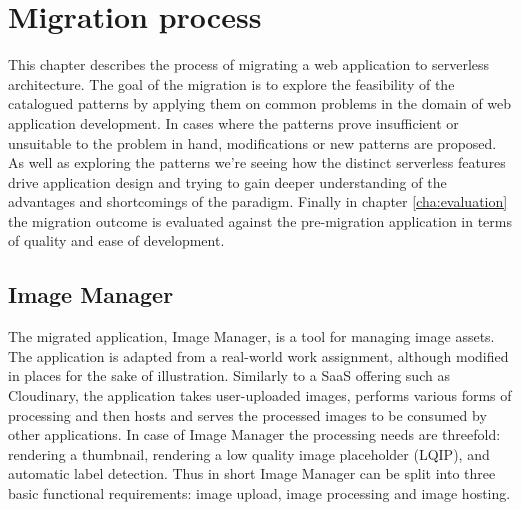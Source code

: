 \chapter{Migration process}

This chapter describes the process of migrating a web application to serverless architecture. The goal of the migration is to explore the feasibility of the catalogued patterns by applying them on common problems in the domain of web application development. In cases where the patterns prove insufficient or unsuitable to the problem in hand, modifications or new patterns are proposed. As well as exploring the patterns we're seeing how the distinct serverless features drive application design and trying to gain deeper understanding of the advantages and shortcomings of the paradigm. Finally in chapter \ref{cha:evaluation} the migration outcome is evaluated against the pre-migration application in terms of quality and ease of development.

\section{Image Manager}

The migrated application, Image Manager, is a tool for managing image assets. The application is adapted from a real-world work assignment, although modified in places for the sake of illustration. Similarly to a SaaS offering such as Cloudinary, the application takes user-uploaded images, performs various forms of processing and then hosts and serves the processed images to be consumed by other applications. In case of Image Manager the processing needs are threefold: rendering a thumbnail, rendering a low quality image placeholder (LQIP), and automatic label detection. Thus in short Image Manager can be split into three basic functional requirements: image upload, image processing and image hosting.


